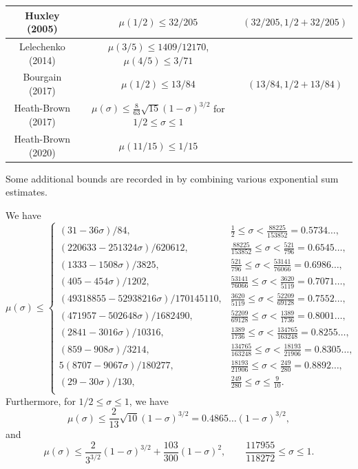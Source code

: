 \begin{table}[ht]
\begin{tabular}{|c|c|c|}
\hline
Huxley (2005) \cite{huxley_exponential_2005} & $\mu(1/2) \leq 32/205$ & $(32/205, 1/2+32/205)$ \\
\hline
Lelechenko (2014) \cite{Lelechenko_linear_2014} & $\mu(3/5) \leq 1409/12170$, $\mu(4/5) \leq 3/71$& \\
\hline
Bourgain (2017) \cite{bourgain_decoupling_2017} & $\mu(1/2) \leq 13/84$ & $(13/84, 1/2+13/84)$ \\
\hline
Heath-Brown (2017) \cite{heathbrown_new_2017} & $\mu(\sigma) \le \frac{8}{63}\sqrt{15}(1 - \sigma)^{3/2}$ for $1/2 \le \sigma \le 1$& \\
\hline
Heath-Brown (2020) \cite{demeter_small_2020} & $\mu(11/15) \leq 1/15$& \\
\hline
\end{tabular}
\end{table}

\literature
{}

Some additional bounds are recorded in \cite{trudgian-yang} by combining various exponential sum estimates.

\begin{theorem}\label{mu_est_thm}\cite[Theorems 2.4-2.6]{trudgian-yang}
    We have
    \[
    \mu(\sigma) \le \begin{cases}
         (31 - 36\sigma)/84 , & \frac{1}{2} \leq\sigma < \frac{88225}{153852} = 0.5734\ldots, \\
         (220633 - 251324\sigma)/620612 , & \frac{88225}{153852} \leq\sigma < \frac{521}{796} = 0.6545\ldots, \\
         (1333 - 1508\sigma)/3825 , & \frac{521}{796} \leq\sigma < \frac{53141}{76066} = 0.6986\ldots, \\
         (405 - 454\sigma)/1202 , & \frac{53141}{76066} \leq\sigma < \frac{3620}{5119} = 0.7071\ldots, \\
         (49318855 - 52938216\sigma)/170145110 , & \frac{3620}{5119} \leq\sigma < \frac{52209}{69128} = 0.7552\ldots, \\
         (471957 - 502648\sigma)/1682490 , & \frac{52209}{69128} \leq\sigma < \frac{1389}{1736} = 0.8001\ldots, \\
         (2841 - 3016\sigma)/10316 , & \frac{1389}{1736} \leq\sigma < \frac{134765}{163248} = 0.8255\ldots, \\
         (859 - 908\sigma)/3214 , & \frac{134765}{163248} \leq\sigma < \frac{18193}{21906} = 0.8305\ldots, \\
         5(8707 - 9067\sigma)/180277 , & \frac{18193}{21906} \leq\sigma < \frac{249}{280} = 0.8892\ldots, \\
         (29 - 30\sigma)/130 , & \frac{249}{280} \leq\sigma \leq \frac{9}{10}.\\
    \end{cases}
    \]
    Furthermore, for $1/2 \le \sigma \le 1$, we have
\[
\mu(\sigma) \le \frac{2}{13}\sqrt{10}(1 - \sigma)^{3/2} = 0.4865\ldots(1 - \sigma)^{3/2},
\]
and
\[
\mu(\sigma) \le \frac{2}{3^{3/2}}(1 - \sigma)^{3/2} + \frac{103}{300}(1 - \sigma)^{2},\qquad \frac{117955}{118272} \le \sigma \le 1.
\]
\end{theorem}

